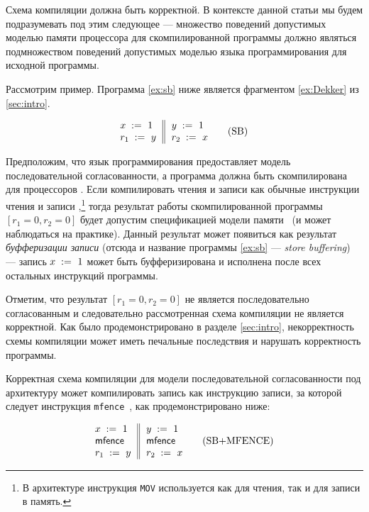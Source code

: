 Схема компиляции должна быть корректной. 
В контексте данной статьи мы будем подразумевать под 
этим следующее --- множество поведений допустимых
моделью памяти процессора для скомпилированной программы 
должно являться подмножеством поведений допустимых 
моделью языка программирования для исходной программы. 

Рассмотрим пример. 
Программа \ref{ex:sb} ниже является 
фрагментом \ref{ex:Dekker} из \cref{sec:intro}.

\begin{equation*}
\inarrII{
   \writeInst{}{x}{1}   \\
   \readInst{}{r_1}{y}  \\
}{
  \writeInst{}{y}{1}   \\
  \readInst{}{r_2}{x}  \\
}
\tag{SB}\label{ex:sb}
\end{equation*}

Предположим, что язык программирования предоставляет 
модель последовательной согласованности, а программа
должна быть скомпилирована для процессоров \Intel. 
Если компилировать чтения и записи как обычные 
инструкции чтения и записи \Intel,\footnote{
В архитектуре \Intel инструкция \texttt{MOV} 
используется как для чтения, так и для записи в память.}
тогда результат работы скомпилированной программы
$[r_1=0, r_2=0]$ будет допустим спецификацией модели памяти~\Intel
(и может наблюдаться на практике). 
Данный результат может появиться как результат 
\emph{буфферизации записи}
(отсюда и название программы \ref{ex:sb} --- \emph{store buffering}) ---  
запись ${x\;:=_{}\;1}$ может быть буфферизирована 
и исполнена после всех остальных инструкций программы. 

Отметим, что результат ${[r_1=0, r_2=0]}$ не является последовательно согласованным
и следовательно рассмотренная схема компиляции не является корректной. 
Как было продемонстрировано в разделе \cref{sec:intro}, 
некорректность схемы компиляции может иметь 
печальные последствия и нарушать корректность программы. 

Корректная схема компиляции для модели последовательной согласованности 
под архитектуру \Intel может компилировать 
запись как инструкцию записи, за которой следует 
инструкция \texttt{mfence}~\cite{Sewell-al:CACM10, Batty-al:POPL11}, 
как продемонстрировано ниже:

\begin{equation*}
\inarrII{
   \writeInst{}{x}{1}   \\
   \mfenceInst          \\
   \readInst{}{r_1}{y}  \\
}{
  \writeInst{}{y}{1}   \\
  \mfenceInst          \\
  \readInst{}{r_2}{x}  \\
}
\tag{SB+MFENCE}\label{ex:sb-mfence}
\end{equation*}

